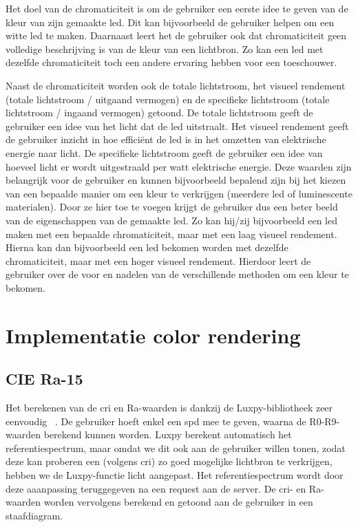 Het doel van de chromaticiteit is om de gebruiker een eerste idee te geven van de kleur van zijn gemaakte \gls{led}. Dit kan bijvoorbeeld de gebruiker helpen om een witte \gls{led} te maken. Daarnaast leert het de gebruiker ook dat chromaticiteit geen volledige beschrijving is van de kleur van een lichtbron. Zo kan een \gls{led} met dezelfde chromaticiteit toch een andere ervaring hebben voor een toeschouwer.

Naast de chromaticiteit worden ook de totale lichtstroom, het visueel rendement (totale lichtstroom / uitgaand vermogen) en de specifieke lichtstroom (totale lichtstroom / ingaand vermogen) getoond. De totale lichtstroom geeft de gebruiker een idee van het licht dat de \gls{led} uitstraalt. Het visueel rendement geeft de gebruiker inzicht in hoe effici\"ent de \gls{led} is in het omzetten van elektrische energie naar licht. De specifieke lichtstroom geeft de gebruiker een idee van hoeveel licht er wordt uitgestraald per watt elektrische energie. Deze waarden zijn belangrijk voor de gebruiker en kunnen bijvoorbeeld bepalend zijn bij het kiezen van een bepaalde manier om een kleur te verkrijgen (meerdere \gls{led} of luminescente materialen). Door ze hier toe te voegen krijgt de gebruiker dus een beter beeld van de eigenschappen van de gemaakte \gls{led}. Zo kan hij/zij bijvoorbeeld een \gls{led} maken met een bepaalde chromaticiteit, maar met een laag visueel rendement. Hierna kan dan bijvoorbeeld een \gls{led} bekomen worden met dezelfde chromaticiteit, maar met een hoger visueel rendement. Hierdoor leert de gebruiker over de voor en nadelen van de verschillende methoden om een kleur te bekomen.

\section{Implementatie color rendering}

\subsection{CIE Ra-15}

Het berekenen van de \gls{cri} en Ra-waarden is dankzij de Luxpy-bibliotheek zeer eenvoudig ~\cite{smetTutorialLuxPyPython2020}. De gebruiker hoeft enkel een \gls{spd} mee te geven, waarna de R0-R9-waarden berekend kunnen worden. Luxpy berekent automatisch het referentiespectrum, maar omdat we dit ook aan de gebruiker willen tonen, zodat deze kan proberen een (volgens \gls{cri}) zo goed mogelijke lichtbron te verkrijgen, hebben we de Luxpy-functie licht aangepast. Het referentiespectrum wordt door deze aaanpassing teruggegeven na een request aan de server. De \gls{cri}- en Ra-waarden worden vervolgens berekend en getoond aan de gebruiker in een staafdiagram.

